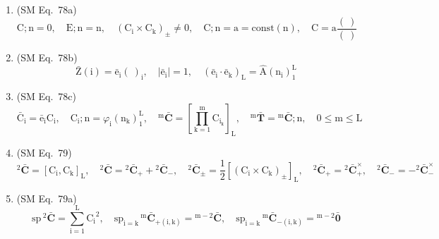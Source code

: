 \documentclass[12pt]{article}
\begin{document}
\begin{enumerate}[label=(\arabic*), series=formellist]
    \item (SM Eq.\ 78a) 
    \[
    \mathrm{C};\mathrm{n} = 0, \quad \mathrm{E};\mathrm{n} = \mathrm{n}, \quad (\mathrm{C_i} \times \mathrm{C_k})_\pm \ne 0, \quad \mathrm{C};\mathrm{n} = \mathrm{a} = \mathrm{const}(\mathrm{n}), \quad \mathrm{C} = \mathrm{a} \frac{(\ )}{(\ )}
    \]

    \item (SM Eq.\ 78b) 
    \[
    \bar{\mathrm{Z}}(\mathrm{i}) = \bar{\mathrm{e}}_\mathrm{i} (\ )_\mathrm{i}, \quad |\bar{\mathrm{e}}_\mathrm{i}| = 1, \quad (\bar{\mathrm{e}}_\mathrm{i} \cdot \bar{\mathrm{e}}_\mathrm{k})_\mathrm{L} = \hat{\mathrm{A}}(\mathrm{n_i})_1^\mathrm{L}
    \]

    \item (SM Eq.\ 78c) 
    \[
    \bar{\mathrm{C}}_\mathrm{i} = \bar{\mathrm{e}}_\mathrm{i} \mathrm{C_i}, \quad \mathrm{C_i};\mathrm{n} = \varphi_\mathrm{i}(\mathrm{n_k})_1^\mathrm{L}, \quad {}^\mathrm{m}\bar{\mathbf{C}} = \left[ \prod_{\mathrm{k}=1}^\mathrm{m} \mathrm{C}_{\mathrm{i_k}} \right]_\mathrm{L}, \quad {}^\mathrm{m}\bar{\mathbf{T}} = {}^\mathrm{m}\bar{\mathbf{C}};\mathrm{n}, \quad 0 \le \mathrm{m} \le \mathrm{L}
    \]

    \item (SM Eq.\ 79) 
    \[
    {}^2\bar{\mathbf{C}} = [\mathrm{C_i}, \mathrm{C_k}]_\mathrm{L}, \quad {}^2\bar{\mathbf{C}} = {}^2\bar{\mathbf{C}}_+ + {}^2\bar{\mathbf{C}}_-, \quad {}^2\bar{\mathbf{C}}_\pm = \frac{1}{2}\left[ (\mathrm{C_i} \times \mathrm{C_k})_\pm \right]_\mathrm{L}, \quad {}^2\bar{\mathbf{C}}_+ = {}^2\bar{\mathbf{C}}_+^\times, \quad {}^2\bar{\mathbf{C}}_- = -{}^2\bar{\mathbf{C}}_-^\times
    \]

    \item (SM Eq.\ 79a) 
    \[
    \mathrm{sp}\,{}^2\bar{\mathbf{C}} = \sum_{\mathrm{i}=1}^\mathrm{L} \mathrm{C_i}^2, \quad \mathrm{sp}_{\mathrm{i=k}}\,{}^\mathrm{m}\bar{\mathbf{C}}_{+(\mathrm{i,k})} = {}^{\mathrm{m}-2}\bar{\mathbf{C}}, \quad \mathrm{sp}_{\mathrm{i=k}}\,{}^\mathrm{m}\bar{\mathbf{C}}_{-(\mathrm{i,k})} = {}^{\mathrm{m}-2}\bar{\mathbf{0}}
    \]


\end{enumerate}
\end{document}

